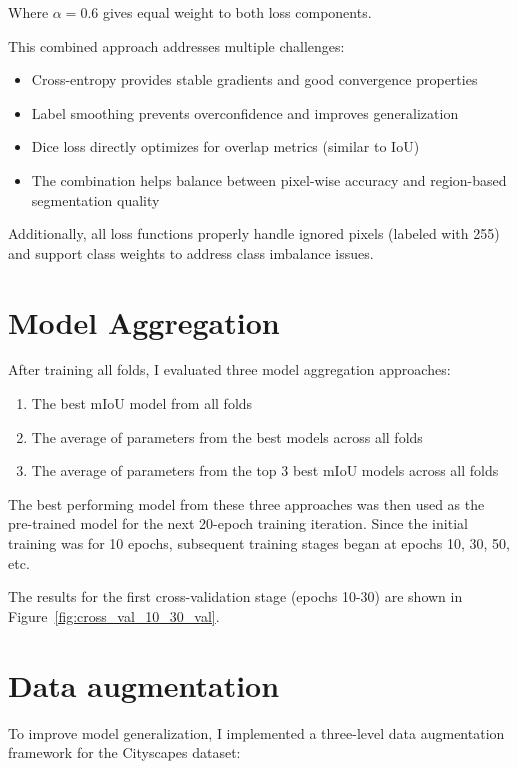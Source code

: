 \documentclass[]{article}
\begin{document}
Where $\alpha = 0.6$ gives equal weight to both loss components.

This combined approach addresses multiple challenges:
\begin{itemize}
    \item Cross-entropy provides stable gradients and good convergence properties
    \item Label smoothing prevents overconfidence and improves generalization
    \item Dice loss directly optimizes for overlap metrics (similar to IoU)
    \item The combination helps balance between pixel-wise accuracy and region-based segmentation quality
\end{itemize}

Additionally, all loss functions properly handle ignored pixels (labeled with 255) and support class weights to address class imbalance issues.


\section{Model Aggregation}\label{sec:Model_Aggregation}
After training all folds, I evaluated three model aggregation approaches:
\begin{enumerate}
    \item The best mIoU model from all folds
    \item The average of parameters from the best models across all folds
    \item The average of parameters from the top 3 best mIoU models across all folds
\end{enumerate}

The best performing model from these three approaches was then used as the pre-trained model for the next 20-epoch training iteration. Since the initial training was for 10 epochs, subsequent training stages began at epochs 10, 30, 50, etc.

The results for the first cross-validation stage (epochs 10-30) are shown in Figure~\ref{fig:cross_val_10_30_val}. 
\section{Data augmentation}\label{sec:Data_Augmentation}
To improve model generalization, I implemented a three-level data augmentation framework for the Cityscapes dataset:
\end{document}
